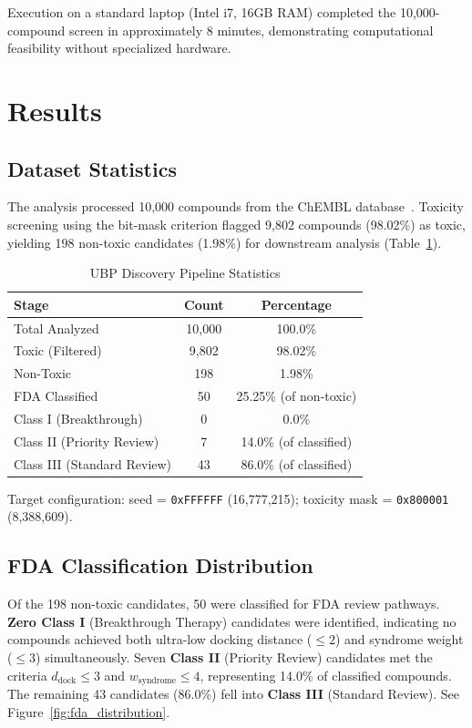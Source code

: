 \documentclass[12pt,a4paper]{article}
\begin{document}
Execution on a standard laptop (Intel i7, 16GB RAM) completed the 10,000-compound screen in approximately 8 minutes, demonstrating computational feasibility without specialized hardware.

\section{Results}

\subsection{Dataset Statistics}

The analysis processed 10,000 compounds from the ChEMBL database~\cite{ChEMBL2024}. Toxicity screening using the bit-mask criterion flagged 9,802 compounds (98.02\%) as toxic, yielding 198 non-toxic candidates (1.98\%) for downstream analysis (Table~\ref{tab:pipeline_stats}).

\begin{table}[H]
\centering
\caption{UBP Discovery Pipeline Statistics}
\label{tab:pipeline_stats}
\begin{tabular}{lcc}
\toprule
\textbf{Stage} & \textbf{Count} & \textbf{Percentage} \\
\midrule
Total Analyzed & 10,000 & 100.0\% \\
Toxic (Filtered) & 9,802 & 98.02\% \\
Non-Toxic & 198 & 1.98\% \\
FDA Classified & 50 & 25.25\% (of non-toxic) \\
\midrule
Class I (Breakthrough) & 0 & 0.0\% \\
Class II (Priority Review) & 7 & 14.0\% (of classified) \\
Class III (Standard Review) & 43 & 86.0\% (of classified) \\
\bottomrule
\end{tabular}
\end{table}

Target configuration: seed = \texttt{0xFFFFFF} (16,777,215); toxicity mask = \texttt{0x800001} (8,388,609).

\subsection{FDA Classification Distribution}

Of the 198 non-toxic candidates, 50 were classified for FDA review pathways. \textbf{Zero Class I} (Breakthrough Therapy) candidates were identified, indicating no compounds achieved both ultra-low docking distance ($\leq2$) and syndrome weight ($\leq3$) simultaneously. Seven \textbf{Class II} (Priority Review) candidates met the criteria $d_{\text{dock}} \leq 3$ and $w_{\text{syndrome}} \leq 4$, representing 14.0\% of classified compounds. The remaining 43 candidates (86.0\%) fell into \textbf{Class III} (Standard Review). See Figure~\ref{fig:fda_distribution}.
\end{document}
